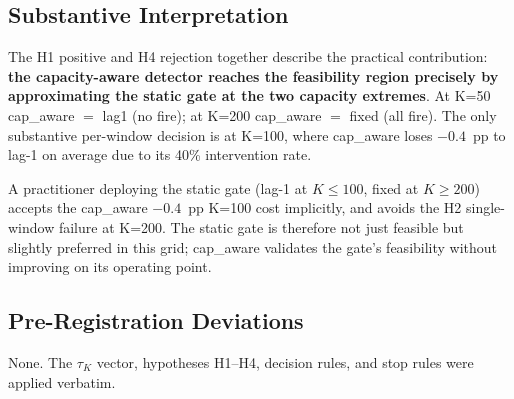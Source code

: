 \subsection{Substantive Interpretation}

The H1 positive and H4 rejection together describe the practical
contribution: \textbf{the capacity-aware detector reaches the
feasibility region precisely by approximating the static gate at the
two capacity extremes}. At K=50 cap\_aware $=$ lag1 (no fire); at
K=200 cap\_aware $=$ fixed (all fire). The only substantive
per-window decision is at K=100, where cap\_aware loses $-0.4$~pp
to lag-1 on average due to its 40\% intervention rate.

A practitioner deploying the static gate (lag-1 at $K \leq 100$,
fixed at $K \geq 200$) accepts the cap\_aware $-0.4$~pp K=100 cost
implicitly, and avoids the H2 single-window failure at K=200.
The static gate is therefore not just feasible but slightly preferred
in this grid; cap\_aware validates the gate's feasibility without
improving on its operating point.

\subsection{Pre-Registration Deviations}

None. The $\tau_K$ vector, hypotheses H1--H4, decision rules, and
stop rules were applied verbatim.
